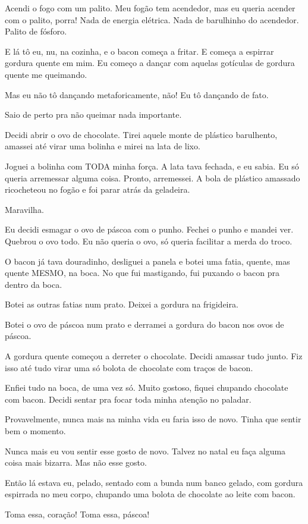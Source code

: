Acendi o fogo com um palito. Meu fogão tem acendedor, mas eu queria acender com o palito, porra! Nada de energia elétrica. Nada de barulhinho do acendedor. Palito de fósforo.

E lá tô eu, nu, na cozinha, e o bacon começa a fritar. E começa a espirrar gordura quente em mim. Eu começo a dançar com aquelas gotículas de gordura quente me queimando.

Mas eu não tô dançando metaforicamente, não! Eu tô dançando de fato.

Saio de perto pra não queimar nada importante.

Decidi abrir o ovo de chocolate. Tirei aquele monte de plástico barulhento, amassei até virar uma bolinha e mirei na lata de lixo.

Joguei a bolinha com TODA minha força. A lata tava fechada, e eu sabia. Eu só queria arremessar alguma coisa. Pronto, arremessei. A bola de plástico amassado ricocheteou no fogão e foi parar atrás da geladeira.

Maravilha.

Eu decidi esmagar o ovo de páscoa com o punho. Fechei o punho e mandei ver. Quebrou o ovo todo. Eu não queria o ovo, só queria facilitar a merda do troco.

O bacon já tava douradinho, desliguei a panela e botei uma fatia, quente, mas quente MESMO, na boca. No que fui mastigando, fui puxando o bacon pra dentro da boca.

Botei as outras fatias num prato. Deixei a gordura na frigideira.

Botei o ovo de páscoa num prato e derramei a gordura do bacon nos ovos de páscoa.

A gordura quente começou a derreter o chocolate. Decidi amassar tudo junto. Fiz isso até tudo virar uma só bolota de chocolate com traços de bacon.

Enfiei tudo na boca, de uma vez só. Muito gostoso, fiquei chupando chocolate com bacon. Decidi sentar pra focar toda minha atenção no paladar.

Provavelmente, nunca mais na minha vida eu faria isso de novo. Tinha que sentir bem o momento.

Nunca mais eu vou sentir esse gosto de novo. Talvez no natal eu faça alguma coisa mais bizarra. Mas não esse gosto.

Então lá estava eu, pelado, sentado com a bunda num banco gelado, com gordura espirrada no meu corpo, chupando uma bolota de chocolate ao leite com bacon.

Toma essa, coração! Toma essa, páscoa!

